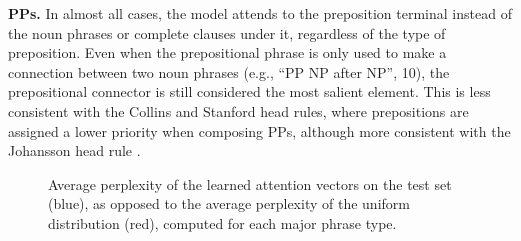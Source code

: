 \documentclass[11pt]{article}
\newcommand{\ask}[1]{\textcolor{orange}{{\textbf{[#1 --\textsc{ask}]}}}}
\newcommand{\nascomment}[1]{\textcolor{blue}{{\textbf{[#1 --\textsc{nas}]}}}}
\renewcommand{\ask}[1]{}
\renewcommand{\nascomment}[1]{}
\begin{document}
\textbf{PPs.} In almost all cases, the model attends to the preposition terminal instead of the noun phrases or complete clauses under it, regardless of the type of preposition. Even when the prepositional phrase is only used to make a connection between two noun phrases (e.g., ``PP  NP after NP'', 10), the prepositional connector is still considered the most salient element. This is less consistent with the Collins and Stanford head rules, where prepositions are assigned a lower priority when composing PPs, although more consistent with the Johansson head rule \cite{Johansson:07}.\ask{To my understanding there is some contention on what the head of a preposition phrase should be. Some might say that the preposition symbol is not important and we should instead pay attention to whatever is under it, but some others say that the preposition symbol is indeed the head. I'm not sure how to formulate this, we should probably cite some previous works that talk and discuss about this.} 





\mydata

\begin{figure}[!h]
\centering
{}
\caption{Average perplexity of the learned attention vectors on the test set (blue), as opposed to the average perplexity of the uniform distribution (red), computed for each major phrase type. \nascomment{perplexity, or entropy?} }
\label{fig:entropy}
\end{figure}
\end{document}
